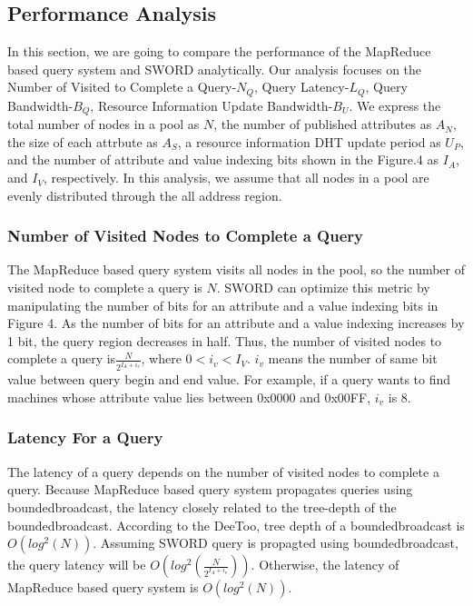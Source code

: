 \documentclass{acm_proc_article-sp}
\begin{document}
\subsection{Performance Analysis}
In this section, we are going to compare the performance of the MapReduce based query system and SWORD analytically. 
Our analysis focuses on the Number of Visited to Complete a Query-$N_Q$, Query Latency-$L_Q$, Query Bandwidth-$B_Q$, Resource Information Update Bandwidth-$B_U$.
We express the total number of nodes in a pool as $N$, the number of published attributes as $A_N$, the size of each attrbute as $A_S$, a resource information DHT update period as $U_P$, 
and the number of attribute and value indexing bits shown in the Figure.4 as $I_A$, and $I_V$, respectively. In this analysis, we assume that all nodes in a pool are evenly distributed through the all address region.

\subsubsection{Number of Visited Nodes to Complete a Query}
The MapReduce based query system visits all nodes in the pool, so the number of visited node to complete a query is $N$.
SWORD can optimize this metric by manipulating the number of bits for an attribute and a value indexing bits in Figure 4. As the number of bits for an attribute and a value indexing increases by 1 bit, 
the query region decreases in half. Thus, the number of visited nodes to complete a query is\begin{math}\frac{N}{2^{I_A+i_v}}\end{math}, where \begin{math}0<i_v<I_V\end{math}.
\begin{math}i_v\end{math} means the number of same bit value between query begin and end value. For example, if a query wants to find machines whose attribute value lies between 0x0000 and 0x00FF, \begin{math}i_v\end{math} is 8. 
\subsubsection{Latency For a Query}
The latency of a query depends on the number of visited nodes to complete a query. Because MapReduce based query system propagates queries using boundedbroadcast, the latency closely related to
the tree-depth of the boundedbroadcast. According to the DeeToo\cite{deetoo}, tree depth of a boundedbroadcast is \begin{math}O(log^2(N))\end{math}. Assuming SWORD query is propagted using boundedbroadcast,
the query latency will be  \begin{math}O(log^2(\frac{N}{2^{I_A+i_v}}))\end{math}. Otherwise, the latency of MapReduce based query system is  \begin{math}O(log^2(N))\end{math}.
\end{document}
